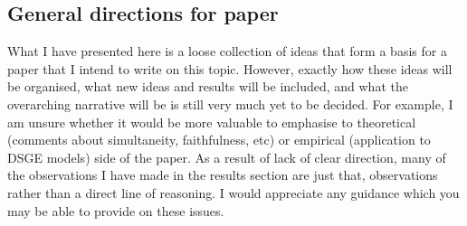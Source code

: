 \documentclass{article}
\begin{document}
\subsection{General directions for paper}

What I have presented here is a loose collection of ideas that form a basis for a paper that I intend to write on this topic. However, exactly how these ideas will be organised, what new ideas and results will be included, and what the overarching narrative will be is still very much yet to be decided. For example, I am unsure whether it would be more valuable to emphasise to theoretical (comments about simultaneity, faithfulness, etc) or empirical (application to DSGE models) side of the paper. As a result of lack of clear direction, many of the observations I have made in the results section are just that, observations rather than a direct line of reasoning. I would appreciate any guidance which you may be able to provide on these issues.

\printbibliography
\end{document}
